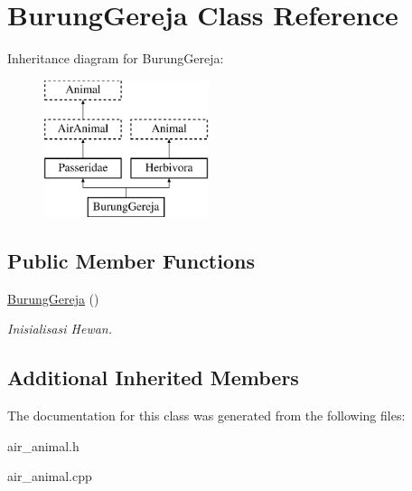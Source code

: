 \hypertarget{class_burung_gereja}{}\section{Burung\+Gereja Class Reference}
\label{class_burung_gereja}
Inheritance diagram for Burung\+Gereja\+:\begin{figure}[H]
\begin{center}
\leavevmode
\includegraphics[height=4.000000cm]{class_burung_gereja}
\end{center}
\end{figure}
\subsection*{Public Member Functions}
\begin{DoxyCompactItemize}
\item 
\hyperlink{class_burung_gereja_a1af7e3d1cd28dc627a6c61c21baf99b2}{Burung\+Gereja} ()\hypertarget{class_burung_gereja_a1af7e3d1cd28dc627a6c61c21baf99b2}{}\label{class_burung_gereja_a1af7e3d1cd28dc627a6c61c21baf99b2}

\begin{DoxyCompactList}\small\item\em Inisialisasi Hewan. \end{DoxyCompactList}\end{DoxyCompactItemize}
\subsection*{Additional Inherited Members}


The documentation for this class was generated from the following files\+:\begin{DoxyCompactItemize}
\item 
air\+\_\+animal.\+h\item 
air\+\_\+animal.\+cpp\end{DoxyCompactItemize}
